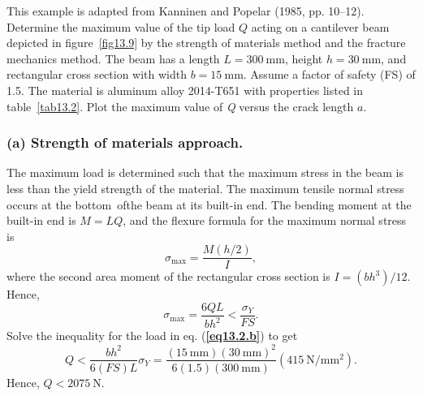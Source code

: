 \documentclass{AeroStructure-ERJohnson}
\begin{document}
\begin{example}\label{ex13.2}This example is adapted from Kanninen and Popelar (1985, pp. 10--12). Determine the maximum value of the tip load $Q$ acting on a cantilever beam depicted in figure~\ref{fig13.9} by the strength of materials method and the fracture mechanics method. The beam has a length $L=300 \mathrm{~mm}$, height $h=30 \mathrm{~mm}$, and rectangular cross section with width $b=15 \mathrm{~mm}$. Assume a factor of safety (FS) of 1.5. The material is aluminum alloy 2014-T651 with properties listed in table~\ref{tab13.2}. Plot the maximum value of \textit{Q} versus the crack length $a$.


\subsubsection{(a) Strength of materials approach.} The maximum load is determined such that the maximum stress in the beam is less than the yield strength of the material. The maximum tensile normal stress occurs at the bottom\pagebreak\ of\break the beam at its built-in end. The bending moment at the built-in end is $M=L Q$, and the flexure formula for the maximum normal stress is
\begin{equation}
\sigma_{\max }=\frac{M(h / 2)}{I}, \label{eq13.2.a}\tag{a}
\end{equation}
where the second area moment of the rectangular cross section is $I=\left(b h^{3}\right) / 12$. Hence,
\begin{equation}
\sigma_{\max }=\frac{6 Q L}{b h^{2}}<\frac{\sigma_{Y}}{F S}. \label{eq13.2.b}\tag{b}
\end{equation}
Solve the inequality for the load in eq. (\textbf{\ref{eq13.2.b}}) to get
\begin{equation}
Q<\frac{b h^{2}}{6(F S) L} \sigma_{Y}=\frac{(15 \mathrm{~mm})(30 \mathrm{~mm})^{2}}{6(1.5)(300 \mathrm{~mm})}(415 \mathrm{~N} / \mathrm{mm}^{2}). \label{eq13.2.c}\tag{c}
\end{equation}
Hence, $Q<2075 \mathrm{~N}$.


\end{example}
\end{document}

